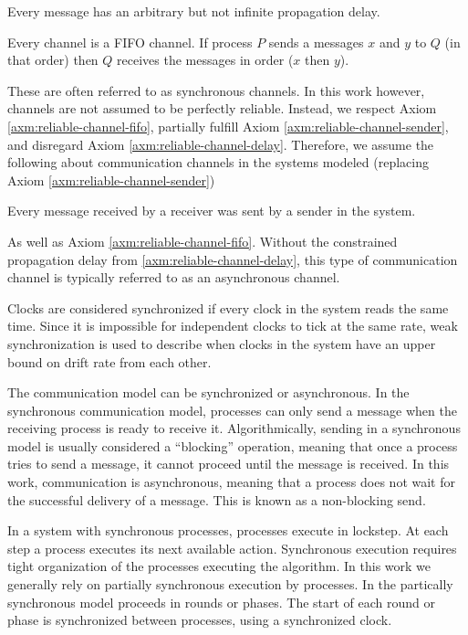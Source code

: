 \begin{axm}
    \label{axm:reliable-channel-delay}
    Every message has an arbitrary but not infinite propagation delay.\cite{DISTRIBUTED}
\end{axm}

\begin{axm}
    \label{axm:reliable-channel-fifo}
    Every channel is a \ac{FIFO} channel. If process $P$ sends a messages $x$ and $y$ to $Q$ (in that order) then $Q$ receives the messages in order ($x$ then $y$).\cite{DISTRIBUTED}
\end{axm}

These are often referred to as synchronous channels.
In this work however, channels are not assumed to be perfectly reliable.
Instead, we respect Axiom \ref{axm:reliable-channel-fifo}, partially fulfill Axiom \ref{axm:reliable-channel-sender}, and disregard Axiom \ref{axm:reliable-channel-delay}.
Therefore, we assume the following about communication channels in the systems modeled (replacing Axiom \ref{axm:reliable-channel-sender})

\begin{axm}
    Every message received by a receiver was sent by a sender in the system.
\end{axm}

As well as Axiom \ref{axm:reliable-channel-fifo}.
Without the constrained propagation delay from \ref{axm:reliable-channel-delay}, this type of communication channel is typically referred to as an asynchronous channel.

Clocks are considered synchronized if every clock in the system reads the same time.
Since it is impossible for independent clocks to tick at the same rate, weak synchronization is used to describe when clocks in the system have an upper bound on drift rate from each other.

The communication model can be synchronized or asynchronous.
In the synchronous communication model, processes can only send a message when the receiving process is ready to receive it.
Algorithmically, sending in a synchronous model is usually considered a ``blocking'' operation, meaning that once a process tries to send a message, it cannot proceed until the message is received.
In this work, communication is asynchronous, meaning that a process does not wait for the successful delivery of a message.
This is known as a non-blocking send.

In a system with synchronous processes, processes execute in lockstep.
At each step a process executes its next available action.
Synchronous execution requires tight organization of the processes executing the algorithm.
In this work we generally rely on partially synchronous execution by processes.
In the partically synchronous model proceeds in rounds or phases.
The start of each round or phase is synchronized between processes, using a synchronized clock.

